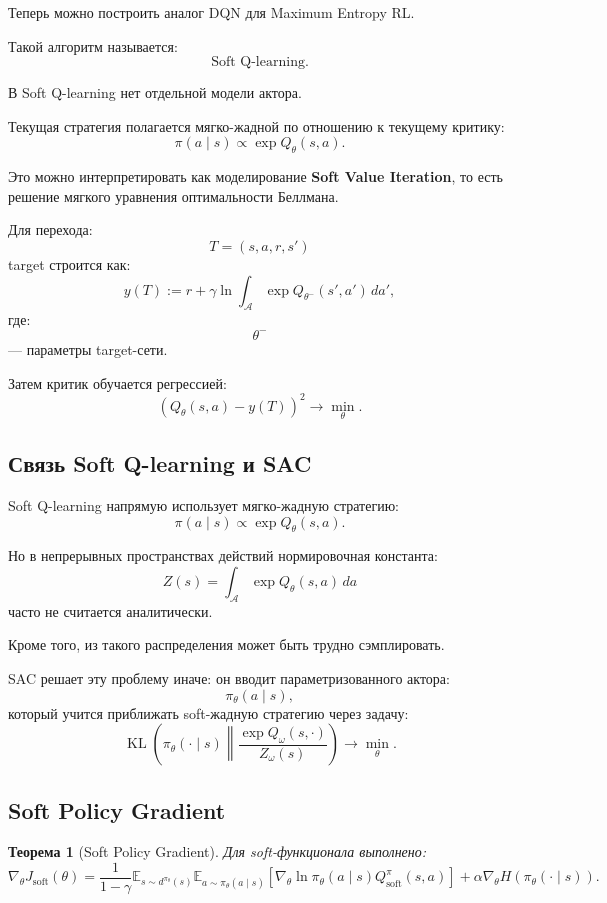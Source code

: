 \documentclass[12pt,a4paper]{article}
\newtheorem{theorem}{Теорема}
\begin{document}
Теперь можно построить аналог DQN для Maximum Entropy RL.

Такой алгоритм называется:
\[
\text{Soft Q-learning}.
\]

В Soft Q-learning нет отдельной модели актора.

Текущая стратегия полагается мягко-жадной по отношению к текущему критику:
\[
\pi(a\mid s)
\propto
\exp Q_\theta(s,a).
\]

Это можно интерпретировать как моделирование \textbf{Soft Value Iteration}, то есть решение мягкого уравнения оптимальности Беллмана.

Для перехода:
\[
T=(s,a,r,s')
\]
target строится как:
\[
y(T)
:=
r
+
\gamma
\ln
\int_{\mathcal A}
\exp Q_{\theta^-}(s',a')
\,da',
\]
где:
\[
\theta^-
\]
--- параметры target-сети.

Затем критик обучается регрессией:
\[
\left(
Q_\theta(s,a)-y(T)
\right)^2
\to
\min_\theta.
\]

\subsection{Связь Soft Q-learning и SAC}

Soft Q-learning напрямую использует мягко-жадную стратегию:
\[
\pi(a\mid s)
\propto
\exp Q_\theta(s,a).
\]

Но в непрерывных пространствах действий нормировочная константа:
\[
Z(s)
=
\int_{\mathcal A}
\exp Q_\theta(s,a)
\,da
\]
часто не считается аналитически.

Кроме того, из такого распределения может быть трудно сэмплировать.

SAC решает эту проблему иначе: он вводит параметризованного актора:
\[
\pi_\theta(a\mid s),
\]
который учится приближать soft-жадную стратегию через задачу:
\[
\operatorname{KL}
\left(
\pi_\theta(\cdot\mid s)
\middle\|
\frac{\exp Q_\omega(s,\cdot)}{Z_\omega(s)}
\right)
\to
\min_\theta.
\]

\subsection{Soft Policy Gradient}

\begin{theorem}[Soft Policy Gradient]
Для soft-функционала выполнено:
\[
\nabla_\theta J_{\mathrm{soft}}(\theta)
=
\frac{1}{1-\gamma}
\mathbb E_{s\sim d^{\pi_\theta}(s)}
\mathbb E_{a\sim\pi_\theta(a\mid s)}
\left[
\nabla_\theta
\ln\pi_\theta(a\mid s)
Q^\pi_{\mathrm{soft}}(s,a)
\right]
+
\alpha
\nabla_\theta
H(\pi_\theta(\cdot\mid s)).
\]
\end{theorem}
\end{document}
